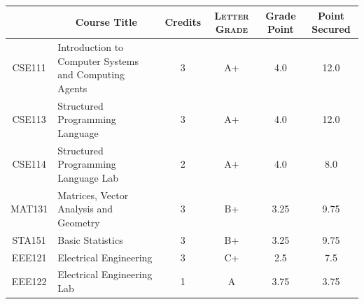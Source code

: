 \documentclass[11pt]{article}
\newcommand*{\numtwo}[1]{\pgfmathprintnumber[
                    fixed, precision=2, fixed zerofill=true]{#1}}
\begin{document}
                \begin{center}
                    \renewcommand{\arraystretch}{1.08}
                    
                \begin{tabular}{|c|l|c|>{\scshape}c|c|c|}
                \hline  \rule[-1ex]{0pt}{3.5ex} {\centering{\bf Course Code}} &  \multicolumn{1}{c|}{\textbf{Course Title}}  & {\bf Credits} & {\bf Letter Grade} & {\bf Grade Point} & {\bf Point Secured}  \\ 
                \hline   CSE111 &  Introduction to Computer Systems and Computing Agents		 & 3 & A+ & 4.0 & 12.0 \\ %
                \hline   CSE113 &  Structured Programming Language		 & 3 & A+ & 4.0 & 12.0 \\ %
                \hline   CSE114 &  Structured Programming Language Lab		 & 2 & A+ & 4.0 & 8.0 \\ %
                \hline   MAT131 &  Matrices, Vector Analysis and Geometry		 & 3 & B+ & 3.25 & 9.75 \\ %
                \hline   STA151 &  Basic Statistics		 & 3 & B+ & 3.25 & 9.75 \\ %
                \hline   EEE121 &  Electrical Engineering		 & 3 & C+ & 2.5 & 7.5 \\ %
                \hline   EEE122 &  Electrical Engineering Lab		 & 1 & A & 3.75 & 3.75 \\ %

\hline                %
                \end{tabular}
                \end{center}
                \renewcommand{\arraystretch}{1.03}
\end{document}
